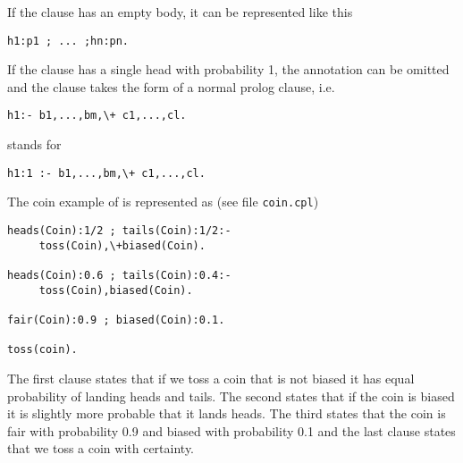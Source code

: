 \documentclass{article}
\begin{document}
If the clause has an empty body, it can be represented like this
\begin{verbatim}
h1:p1 ; ... ;hn:pn.
\end{verbatim}
If the clause has a single head with probability 1, the annotation can be omitted and the clause takes the form of a normal prolog clause, i.e. 
\begin{verbatim}
h1:- b1,...,bm,\+ c1,...,cl.
\end{verbatim}
stands for 
\begin{verbatim}
h1:1 :- b1,...,bm,\+ c1,...,cl.
\end{verbatim}

The coin example of  \cite{VenVer04-ICLP04-IC} is represented as (see file \texttt{coin.cpl})
\begin{verbatim}
heads(Coin):1/2 ; tails(Coin):1/2:- 
     toss(Coin),\+biased(Coin).

heads(Coin):0.6 ; tails(Coin):0.4:- 
     toss(Coin),biased(Coin).

fair(Coin):0.9 ; biased(Coin):0.1.

toss(coin).
\end{verbatim}
The first clause states that if we toss a coin that is not biased it has equal probability of landing heads and tails. The second states that if the coin is biased it is slightly more probable that it lands heads. The third states that the coin is fair with probability 0.9 and biased with probability 0.1 and the last clause states that we toss a coin with certainty.
\end{document}
